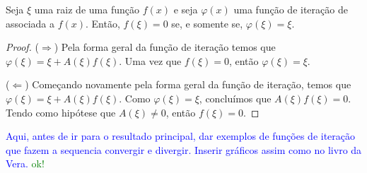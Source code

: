 
\begin{prop}
Seja $\xi$ uma raiz de uma função $f(x)$ e seja $\varphi(x)$ uma função de iteração de associada a $f(x)$. Então, $f(\xi) = 0$ se, e somente se, $\varphi(\xi) = \xi$.
\end{prop}


\begin{proof}
($\Rightarrow$) Pela forma geral da função de iteração temos que $\varphi(\xi) = \xi + A(\xi)f(\xi)$. Uma vez que $f(\xi) = 0$, então $\varphi(\xi) = \xi$.

($\Leftarrow$) Começando novamente pela forma geral da função de iteração, temos que $\varphi(\xi) = \xi + A(\xi)f(\xi)$. Como $\varphi(\xi) = \xi$, concluímos que $A(\xi) f(\xi) = 0$. Tendo como hipótese que $A(\xi) \neq 0$, então $f(\xi) = 0$.
\end{proof}


\textcolor{blue}{Aqui, antes de ir para o resultado principal, dar exemplos de funções de iteração que fazem a sequencia convergir e divergir. Inserir gráficos assim como no livro da Vera.} \textcolor{green}{ok!}\\

